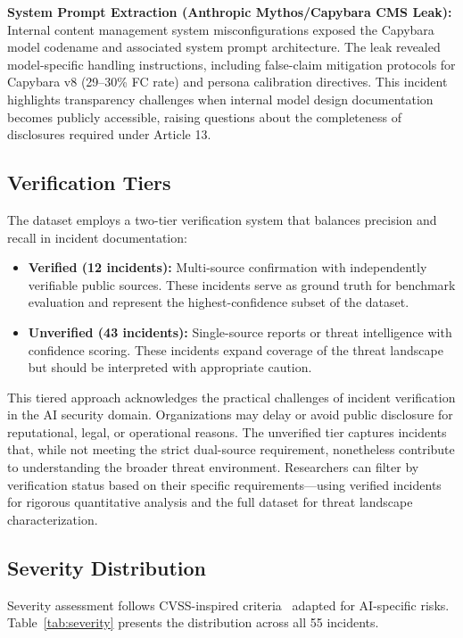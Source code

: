 \documentclass[10pt,conference]{IEEEtran}
\begin{document}
\textbf{System Prompt Extraction (Anthropic Mythos/Capybara CMS Leak):} Internal content management system misconfigurations exposed the Capybara model codename and associated system prompt architecture. The leak revealed model-specific handling instructions, including false-claim mitigation protocols for Capybara v8 (29--30\% FC rate) and persona calibration directives. This incident highlights transparency challenges when internal model design documentation becomes publicly accessible, raising questions about the completeness of disclosures required under Article 13.

\subsection{Verification Tiers}

The dataset employs a two-tier verification system that balances precision and recall in incident documentation:

\begin{itemize}
    \item \textbf{Verified (12 incidents):} Multi-source confirmation with independently verifiable public sources. These incidents serve as ground truth for benchmark evaluation and represent the highest-confidence subset of the dataset.
    \item \textbf{Unverified (43 incidents):} Single-source reports or threat intelligence with confidence scoring. These incidents expand coverage of the threat landscape but should be interpreted with appropriate caution.
\end{itemize}

This tiered approach acknowledges the practical challenges of incident verification in the AI security domain. Organizations may delay or avoid public disclosure for reputational, legal, or operational reasons. The unverified tier captures incidents that, while not meeting the strict dual-source requirement, nonetheless contribute to understanding the broader threat environment. Researchers can filter by verification status based on their specific requirements---using verified incidents for rigorous quantitative analysis and the full dataset for threat landscape characterization.

\subsection{Severity Distribution}

Severity assessment follows CVSS-inspired criteria~\cite{cvss2024} adapted for AI-specific risks. Table~\ref{tab:severity} presents the distribution across all 55 incidents.
\end{document}
